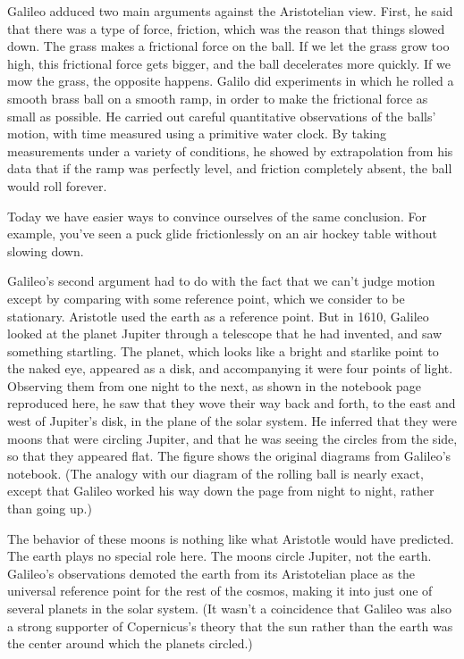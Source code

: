 \begin{figure}\label{fig:soccer-ball}
\end{figure}

Galileo adduced two main arguments against the Aristotelian view. First, he said
that there was a type of force, friction, which was the reason that things slowed down.
The grass makes a frictional force on the ball. If we let the grass grow too high,
this frictional force gets bigger, and the ball decelerates more quickly. If we mow
the grass, the opposite happens. Galilo did experiments in which he rolled a smooth
brass ball on a smooth ramp, in order to make the frictional force as small as possible.
He carried out careful quantitative observations of the balls' motion, with time
measured using a primitive water clock. By taking measurements under a variety of
conditions, he showed by extrapolation from his data that if the ramp was perfectly level,
and friction completely absent, the ball would roll forever. 

Today we have easier ways
to convince ourselves of the same conclusion. For example, you've seen a puck glide frictionlessly on an air hockey table
without slowing down.

Galileo's second argument had to do with the fact that we can't judge motion except by
comparing with some reference point, which we consider to be stationary. Aristotle
used the earth as a reference point. 
But in 1610, Galileo looked at the planet Jupiter through a telescope that he had invented, and
saw something startling. The planet, which looks like a bright and starlike point to the naked eye,
appeared as a disk, and accompanying it were four points of light. Observing them from one
night to the next, as shown in the notebook page reproduced here, he saw that they wove their
way back and forth, to the east and west of Jupiter's disk, in the plane of the solar system.
He inferred that they were moons
that were circling Jupiter, and that he was seeing the circles from the side, so
that they appeared flat. The figure  shows the original diagrams from Galileo's notebook.
(The analogy with our diagram of the rolling ball is nearly exact,
except that Galileo worked his way down the page from night to night, rather than going up.)

The behavior of these moons is nothing like what Aristotle would have predicted. The earth
plays no special role here. The moons circle Jupiter, not the earth. Galileo's observations demoted
the earth from its Aristotelian place as the universal reference point for the rest of the cosmos,
making it into just one of several planets in the solar system. (It wasn't a coincidence that Galileo
was also a strong supporter of Copernicus's theory that the sun rather than the earth was the center
around which the planets circled.)

